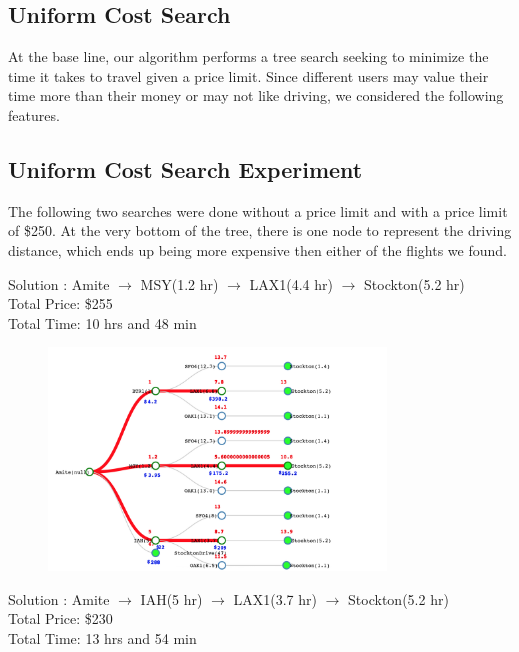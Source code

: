 \documentclass[11pt]{article}
\begin{document}
\subsection{Uniform Cost Search}

At the base line, our algorithm performs a tree search seeking to minimize the time it takes to travel given a price limit. 
Since different users may value their time more than their money or may not like driving, we considered the following features.

\subsection{Uniform Cost Search Experiment}

The following two searches were done without a price limit and with a price limit of \$250. At the very bottom of the tree, there is one node to represent the driving distance, which ends up being more expensive then either of the flights we found. 
\begin{center}
Solution : Amite $\rightarrow$ MSY(1.2 hr) $\rightarrow$ LAX1(4.4 hr) $\rightarrow$ Stockton(5.2 hr) \\
\quad Total Price: \$255 \\
\quad Total Time: 10 hrs and 48 min
\end{center}

\begin{figure}[!ht]
  \centering
  \includegraphics[width=0.8\textwidth]{time}
  \label{fig:time}
\end{figure}

\pagebreak

\begin{center}
Solution : Amite $\rightarrow$ IAH(5 hr) $\rightarrow$ LAX1(3.7 hr) $\rightarrow$ Stockton(5.2 hr) \\
\quad Total Price: \$230 \\
\quad Total Time: 13 hrs and 54 min\\
\end{center}
\end{document}
